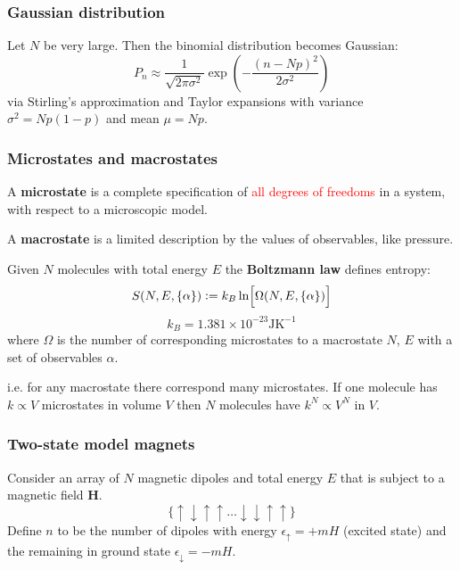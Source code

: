 \documentclass{article}
\newcommand{\deq}{\vcentcolon=}
\newcommand{\vc}[1]{\boldsymbol{#1}}
\begin{document}
\begin{multicols*}{3}
\subsubsection*{Gaussian distribution}
Let $N$ be very large. Then the binomial distribution
becomes Gaussian:
$$P_n\approx\frac{1}{\sqrt{2\pi\sigma^2}}
\exp\left(-\frac{(n-Np)^2}{2\sigma^2}\right)$$
via Stirling's approximation and Taylor expansions
with variance $\sigma^2=Np(1-p)$ and mean $\mu=Np$.

\subsubsection*{Microstates and macrostates}
A \textbf{microstate} is a complete specification of
\textcolor{red}{all degrees of freedoms} in a system,
with respect to a microscopic model.

A \textbf{macrostate} is a limited description
by the values of observables, like pressure.

Given $N$ molecules with total energy $E$
the \textbf{Boltzmann law} defines entropy:
$$S(N,E,\{\alpha\})\deq k_B\ln\Bigl[
\Omega(N,E,\{\alpha\})\Bigr]$$
$$k_B=1.381\times10^{-23}\text{J}\text{K}^{-1}$$
where $\Omega$ is the number of corresponding
microstates to a macrostate $N$, $E$ with a set of
observables $\alpha$.

i.e. for any macrostate there correspond
many microstates. If one molecule
has $k\propto V$ microstates
in volume $V$ then $N$
molecules have $k^N\propto V^N$ in $V$.

\subsubsection*{Two-state model magnets}
Consider an array of $N$ magnetic dipoles 
and total energy $E$
that is subject to a magnetic field $\vc{H}$.
$$\{\uparrow\downarrow\uparrow\uparrow\dots
\downarrow\downarrow\uparrow\uparrow\}$$
Define $n$ to be the number of
dipoles with energy $\epsilon_{\uparrow}=+mH$
(excited state) and the remaining
in ground state $\epsilon_{\downarrow}=-mH$.


\end{multicols*}
\end{document}
